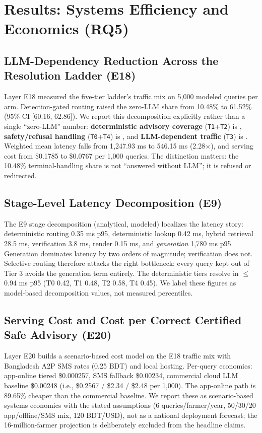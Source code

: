 \section{Results: Systems Efficiency and Economics (RQ5)}
\label{sec:results_efficiency}

\subsection{LLM-Dependency Reduction Across the Resolution Ladder (E18)}
Layer E18 measured the five-tier ladder's traffic mix on 5{,}000 modeled queries per arm. Detection-gated routing raised the zero-LLM share from 10.48\% to 61.52\% (95\% CI [60.16, 62.86]). We report this decomposition explicitly rather than a single ``zero-LLM'' number: \textbf{deterministic advisory coverage} (\texttt{T1}+\texttt{T2}) is \DetAdvisoryCoverage{}, \textbf{safety/refusal handling} (\texttt{T0}+\texttt{T4}) is \SafetyRefusalHandling{}, and \textbf{LLM-dependent traffic} (\texttt{T3}) is \LLMDependent{}. Weighted mean latency falls from 1{,}247.93 ms to 546.15 ms (2.28$\times$), and serving cost from \$0.1785 to \$0.0767 per 1{,}000 queries. The distinction matters: the 10.48\% terminal-handling share is not ``answered without LLM''; it is refused or redirected.

\subsection{Stage-Level Latency Decomposition (E9)}
The E9 stage decomposition (analytical, modeled) localizes the latency story: deterministic routing 0.35 ms p95, deterministic lookup 0.42 ms, hybrid retrieval 28.5 ms, verification 3.8 ms, render 0.15 ms, and \emph{generation} 1{,}780 ms p95. Generation dominates latency by two orders of magnitude; verification does not. Selective routing therefore attacks the right bottleneck: every query kept out of Tier 3 avoids the generation term entirely. The deterministic tiers resolve in $\le$0.94 ms p95 (T0 0.42, T1 0.48, T2 0.58, T4 0.45). We label these figures as model-based decomposition values, not measured percentiles.

\subsection{Serving Cost and Cost per Correct Certified Safe Advisory (E20)}
Layer E20 builds a scenario-based cost model on the E18 traffic mix with Bangladesh A2P SMS rates (0.25 BDT) and local hosting. Per-query economics: app-online tiered \$0.000257, SMS fallback \$0.00234, commercial cloud LLM baseline \$0.00248 (i.e., \$0.2567 / \$2.34 / \$2.48 per 1{,}000). The app-online path is 89.65\% cheaper than the commercial baseline. We report these as scenario-based systems economics with the stated assumptions (6 queries/farmer/year, 50/30/20 app/offline/SMS mix, 120 BDT/USD), not as a national deployment forecast; the 16-million-farmer projection is deliberately excluded from the headline claims.

